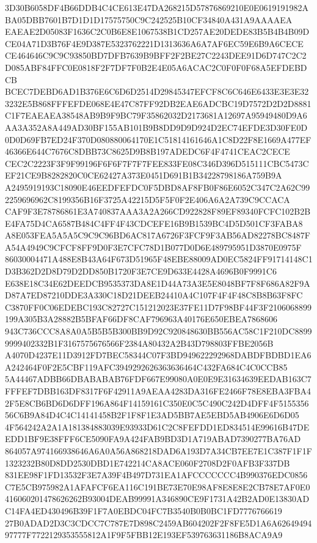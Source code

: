 \documentclass[UTF8,fontset=fandol,zihao=-4,a4paper]{ctexart}
\begin{document}
{{3D30B6058DF4B66DDB4C4CE613E47DA268215D57876869210E0E0619191982ABA05DBB7601B7D1D1D17575750C9C242525B10CF34840A431A9AAAAEA
EAEAE2D05083F1636C2C0B6E8E1067538B1CD257AE20DEDE83B5B4B4B09DCE04A71D3B76F4E9D387E5323762221D1313636A6A7AF6EC59E6B9A6CECE
CE464646C9C9C93850BD7DFB7639B9BFF2F2BE27C2243DEE91D6D747C2C2D085ABF84FFC0E0818F2F7DF7F0B2E4E05A6ACAC2C0F0F0F68A5EFDEBDCB
BCEC7DEBD6AD1B376E6C6D6D2514D29845347EFCF8C6C646E6433E3E3E323232E5B868FFFEFDE068E4E47C87FF92DB2EAE6ADCBC19D7572D2D2D8881
C1F7EAEAEA38548AB9B9F9BC79F35862032D2173681A12697A95949480D9A6AA3A352A8A449AD30BF155AB101B9B8DD9D9D924D2EC74EFDE3D30FE0D
0D0D69FB7ED24F370D080880064170E1C51814161646A1C8D22F8E1669A477EF46366E644C7676C8DBB73C8625D9B8B197ADEDC6F4F4741CEAC2CECE
CEC2C2223F3F9F99196F6F6F7F7F7FEE833FE08C346D396D515111CBC5473CEF21CE9B8282820C0CE62427A373E0451D691B1B34228798186A759B9A
A2495919193C18090E46EEDFEFDC0F5DBD8AF8FB0F86E6052C347C2A62C992259696962C8199356B16F3725A42215D5F5F0F2E406A6A2A739C9CCACA
CAF9F3E78786861E3A740837AAA3A2A266CD922828F89EF89340FCFC102B2BE4FA75D4CA6587B484C4FF4F43CDCEFE16B9B1539BC4D5D501CF3FABA8
A8E053FEA5A5A5C9C9C96BD6AC817A6726F3FCF9F3AB56AD82278BC8487FA54A4949C9CFCF8FF9D0F3E7CFC78D1B077D0D6E489795951D3870E0975F
86030004471A488E8B43A64F673D51965F48EBE88009AD0EC5824FF91714148C1D3B362D2D8D79D2DD850B1720F3E7CE9D633E4428A4696B0F9991C6
E638E18C34E62DEEDCB9535373DA8E1D44A73A3E5E8048BF7F8F686A82F9AD87A7ED87210DDE3A330C18D21DEEB24410A4C107F4F4F48C8B8B63F8FC
C3870FF0C06EDEBC193C82727C151212023E37FE11D7F98BF44F3F2106068899199A305B3A28882B5BFAF66DF8CAF796963A40176E650EBEA7868606
943C736CCC8A8A0A5B5B5B300BB9D92C920848630BB556AC58C1F210DC88999999402332B1F3167575676566F2384A80432A2B43D798803FFBE2056B
A4070D4237E11D3912FD7BEC58344C07F3BD949622292968DABDFBDBD1EA6A242464F0F2E5CBF119AFC3949292626363636464C432FA684C4C0CCB85
5A44467ADBB66DBABABAB76FDF667E99080A0E0E9E31634639EEDAB163C7FFFEF7DBB163DF8317F6F42911A9AEAA4283DA316FE2466F78E8EBA3FBA4
2F5E8CB6BD6D6DFF196A864F14159161C350E0C5C490C242D4DFF4F515535656C6B9A84D4C4C14141458B2F1F8F1E3AD5BB7AE5EBD5AB4906E6D6D05
4F564242A2A1A181384883039E93933D61C2C8FEFDD1ED834514E99616B47DEEDD1BF9E38FFF6CE5090FA9A424FAB9BD3D1A719ABAD7390277BA76AD
864057A974166938646A6A0A56A868218DAD6A193D7A34CB7EE7E1C387F1F1F1323232B80D8DD2530DBD1E742214CA8ACE060F2708D2F0AFB3F337DB
831EE98F1FD13532F3E7A39F4B497D731EA1AFCCCCCCC4B990376EDC0856C7E5CB975982A1AFAFCF6EA116C191BE73E70E98AF8E8E8E2CB78E7AF0E0
416060201478626262B93004DEAB99991A346890CE9F1731A42B2AD0E13830ADC14FA4ED430496B39F1F7A0EBDC04FC7B3540B0B0BC1FD7776766619
27B0ADAD2D3C3CDCC7C787E7D898C2459AB604202F2F8FE5D1A6A6264949497777F7722129353555812A1F9F5FBB12E193EF539763631186B8ACA9A9
}}
\end{document}
